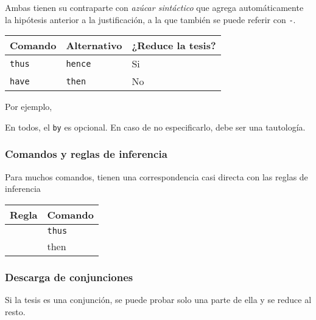 Ambas tienen su contraparte con \textit{azúcar sintáctico} que agrega
automáticamente la hipótesis anterior a la justificación, a la que también se
puede referir con \texttt{-}.

\begin{table}[H]
    \centering
\begin{tabular}{l|l|l}
Comando             & Alternativo             & ¿Reduce la tesis? \\
\hline
\lstinline|thus|    & \lstinline|hence|       & Si               \\
\lstinline|have|    & \lstinline|then|        & No              
\end{tabular}
\end{table}

Por ejemplo, 
\begin{multicols}{2}
    
    \vfill\null
    \columnbreak
    
\end{multicols}


En todos, el \lstinline{by} es opcional. En caso de no especificarlo, debe ser
una tautología.



\subsubsection{Comandos y reglas de inferencia}

Para muchos comandos, tienen una correspondencia casi directa con las reglas de
inferencia
\begin{table}[H]
    \centering
    \begin{tabular}{l|l}
    Regla & Comando \\
    \hline
      & \lstinline|thus|   \\
      & then   
    \end{tabular}
\end{table}

\subsubsection{Descarga de conjunciones}\label{ppa:sec:and-intro}

Si la tesis es una conjunción, se puede probar solo una parte de ella y se
reduce al resto.



